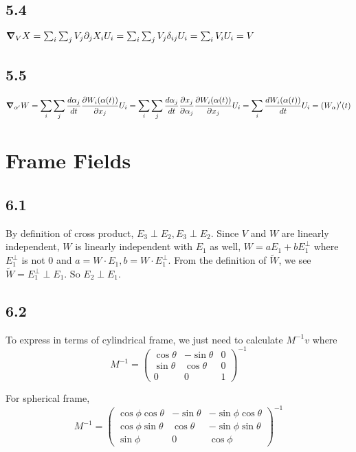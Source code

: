 \documentclass[12pt]{article}
\begin{document}
\subsection*{5.4}
$\grad_V X = \sum_i \sum_j V_j \partial_j X_i U_i  = \sum_i \sum_j V_j \delta_{ij} U_i = \sum_i V_i U_i = V$

\subsection*{5.5}
$$\grad_{\alpha'}W = \sum_i \sum_j \frac{d \alpha_j}{dt} \frac{\partial W_i(\alpha(t))}{\partial x_j} U_i = \sum_i \sum_j \frac{d \alpha_j}{dt} \frac{\partial x_j}{\partial \alpha_j } \frac{\partial W_i(\alpha(t))}{\partial x_j} U_i = \sum_i \frac{dW_i(\alpha(t))}{dt}U_i  = (W_\alpha)'(t)$$

\section{Frame Fields}

\subsection*{6.1}
By definition of cross product, $E_3 \perp E_2, E_3 \perp E_2$. Since $V$ and $W$ are linearly independent, $W$ is linearly independent with $E_1$ as well, $W = aE_1 + bE_1^{\perp}$ where $E_1^{\perp}$ is not 0 and $a = W\cdot E_1, b= W \cdot E_1^{\perp}$. From the definition of $\tilde{W}$, we see $\tilde{W} = E_1^{\perp} \perp E_1$. So $E_2 \perp E_1$.

\subsection*{6.2}
To express in terms of cylindrical frame, we just need to calculate $M^{-1}v$
where 
$$ M^{-1} =  \begin{pmatrix}
	\cos\theta &  -\sin \theta & 0\\
	\sin \theta & \cos \theta & 0\\ 
	0 & 0 & 1
\end{pmatrix}^{-1}$$

For spherical frame, 
$$
 M^{-1} = \begin{pmatrix}
 	\cos \phi \cos \theta &  -\sin \theta & -\sin\phi \cos \theta \\
 	\cos \phi \sin \theta & \cos \theta & -\sin\phi \sin \theta \\
 	\sin \phi & 0 & \cos \phi
 \end{pmatrix}^{-1}
$$
\end{document}
